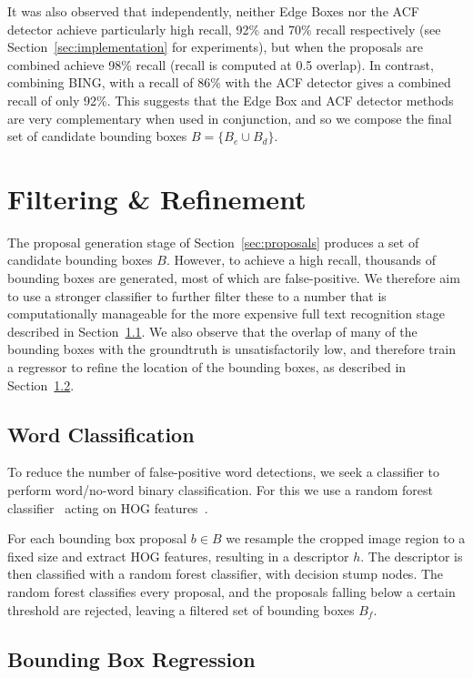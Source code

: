 \documentclass[twocolumn]{svjour3}          \smartqed  \usepackage{epsfig}
\begin{document}
It was also observed that independently, neither Edge Boxes nor the ACF detector achieve particularly high recall, 92\% and 70\% recall respectively (see Section~\ref{sec:implementation} for experiments), but when the proposals are combined achieve 98\% recall (recall is computed at 0.5 overlap). In contrast, combining BING, with a recall of 86\% with the ACF detector gives a combined recall of only 92\%. This suggests that the Edge Box and ACF detector methods are very complementary when used in conjunction, and so we compose the final set of candidate bounding boxes $B = \{B_e \cup B_d\}$.

\section{Filtering \& Refinement}
\label{sec:filtering}
The proposal generation stage of Section~\ref{sec:proposals} produces a set of candidate bounding boxes $B$. However, to achieve a high recall, thousands of bounding boxes are generated, most of which are false-positive. We therefore aim to use a stronger classifier to further filter these to a number that is computationally manageable for the more expensive full text recognition stage described in Section~\ref{sec:classification}. We also observe that the overlap of many of the bounding boxes with the groundtruth is unsatisfactorily low, and therefore train a regressor to refine the location of the bounding boxes, as described in Section~\ref{sec:regression}. 

\subsection{Word Classification}
\label{sec:classification}
To reduce the number of false-positive word detections, we seek a classifier to perform word/no-word binary classification. For this we use a random forest classifier~\cite{Breiman01} acting on HOG features~\cite{Felzenszwalb10a}. 

For each bounding box proposal $b \in B$ we resample the cropped image region to a fixed size and extract HOG features, resulting in a descriptor $h$. The descriptor is then classified with a random forest classifier, with decision stump nodes. The random forest classifies every proposal, and the proposals falling below a certain threshold are rejected, leaving a filtered set of bounding boxes $B_f$.

\subsection{Bounding Box Regression}
\label{sec:regression}
\end{document}

